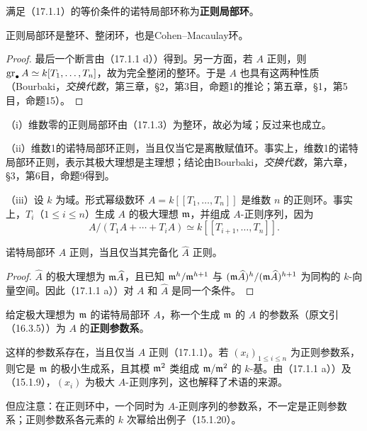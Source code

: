 满足（17.1.1）的等价条件的诺特局部环称为\textbf{正则局部环}。

正则局部环是整环、整闭环，也是Cohen--Macaulay环。
\begin{proof}
最后一个断言由（17.1.1 d））得到。另一方面，若 $A$ 正则，则 $\operatorname{gr}_\bullet A\simeq k[T_1,\ldots,T_n]$，故为完全整闭的整环。于是 $A$ 也具有这两种性质（Bourbaki，\textit{交换代数}，第三章，§2，第3目，命题1的推论；第五章，§1，第5目，命题15）。
\end{proof}

（i）维数零的正则局部环由（17.1.3）为整环，故必为域；反过来也成立。

（ii）维数1的诺特局部环正则，当且仅当它是离散赋值环。事实上，维数1的诺特局部环正则，表示其极大理想是主理想；结论由Bourbaki，\textit{交换代数}，第六章，§3，第6目，命题9得到。

（iii）设 $k$ 为域。形式幂级数环 $A=k[[T_1,\ldots,T_n]]$ 是维数 $n$ 的正则环。事实上，$T_i$（$1\leq i\leq n$）生成 $A$ 的极大理想 $\mathfrak m$，并组成 $A$-正则序列，因为
\[
 A/(T_1A+\cdots+T_iA)\simeq k[[T_{i+1},\ldots,T_n]].
\]

诺特局部环 $A$ 正则，当且仅当其完备化 $\widehat A$ 正则。
\begin{proof}
$\widehat A$ 的极大理想为 $\mathfrak m\widehat A$，且已知
$\mathfrak m^h/\mathfrak m^{h+1}$ 与 $(\mathfrak m\widehat A)^h/(\mathfrak m\widehat A)^{h+1}$ 为同构的 $k$-向量空间。因此（17.1.1 a））对 $A$ 和 $\widehat A$ 是同一个条件。
\end{proof}

给定极大理想为 $\mathfrak m$ 的诺特局部环 $A$，称一个生成 $\mathfrak m$ 的 $A$ 的参数系（原文引（16.3.5））为 $A$ 的\textbf{正则参数系}。

这样的参数系存在，当且仅当 $A$ 正则（17.1.1）。若 $(x_i)_{1\leq i\leq n}$ 为正则参数系，则它是 $\mathfrak m$ 的极小生成系，且其模 $\mathfrak m^2$ 类组成 $\mathfrak m/\mathfrak m^2$ 的 $k$-基。由（17.1.1 a））及（15.1.9），$(x_i)$ 为极大 $A$-正则序列，这也解释了术语的来源。

但应注意：在正则环中，一个同时为 $A$-正则序列的参数系，不一定是正则参数系；正则参数系各元素的 $k$ 次幂给出例子（15.1.20）。

